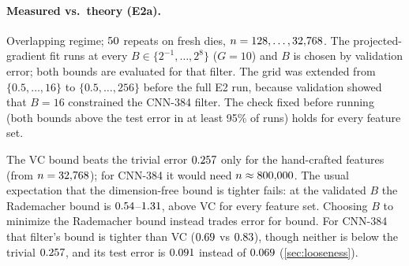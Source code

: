 \paragraph{Measured vs.\ theory (E2a).} Overlapping regime; $50$ repeats on fresh dies,
$n=128,\dots,32{,}768$. The projected-gradient fit runs at every $B\in\{2^{-1},\dots,2^8\}$
($G=10$) and $B$ is chosen by validation error; both bounds are evaluated for that filter. The grid
was extended from $\{0.5,\dots,16\}$ to $\{0.5,\dots,256\}$ before the full E2 run, because validation
showed that $B=16$ constrained the CNN-384 filter. The
check fixed before running (both bounds above the test error in at least 95\% of runs) holds for
every feature set.

\begin{center}
\small
{}
\end{center}

The VC bound beats the trivial error $0.257$ only for the hand-crafted features (from
$n=32{,}768$); for CNN-384 it would need $n\approx800{,}000$. The usual expectation
that the dimension-free bound is tighter fails: at the validated $B$ the Rademacher bound is
$0.54$--$1.31$, above VC for every feature set. Choosing $B$ to minimize the
Rademacher bound instead trades error for bound. For CNN-384 that filter's bound is tighter than VC
($0.69$ vs $0.83$), though neither is below the trivial $0.257$,
and its test error is $0.091$ instead of $0.069$
(\cref{sec:looseness}).

